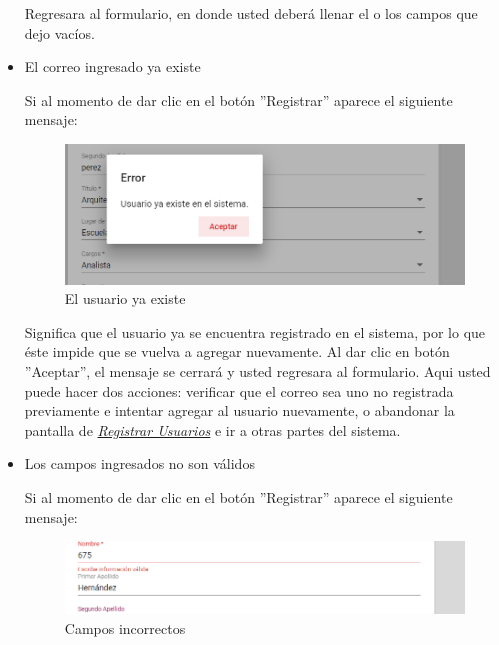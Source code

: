 \begin{itemize}
                         Regresara  al formulario, en donde usted deberá llenar el o los campos que dejo vacíos.

                    \item El correo ingresado ya existe

                        Si al momento de dar clic en el botón ''Registrar'' aparece el siguiente mensaje:

                         \begin{figure}[!hbtp]
                        	\centering
                        \includegraphics[width=0.4\linewidth]{images/SP5/MSG36}
                        	\caption{El usuario ya existe}
                        	\label{mensaje36}

                        \end{figure}

                        Significa que el usuario ya se encuentra registrado en el sistema, por lo que éste impide que se vuelva a agregar nuevamente. Al dar clic en botón ''Aceptar'', el mensaje se cerrará y usted regresara al formulario. Aqui usted puede hacer dos acciones: verificar que el correo sea uno no registrada previamente e intentar agregar al usuario nuevamente, o abandonar la pantalla de \hyperlink{registrarUs}{\textit{Registrar Usuarios}} e ir a otras partes del sistema.
                    \newpage
                    \item Los campos ingresados no son válidos

                        Si al momento de dar clic en el botón ''Registrar'' aparece el siguiente mensaje:
                         \begin{figure}[!hbtp]
                        	\centering
                        	\includegraphics[width=0.4\linewidth]{images/SP5/MSG35}
                        	\caption{Campos incorrectos}
                        	\label{mensaje35}

                        \end{figure}


\end{itemize}
